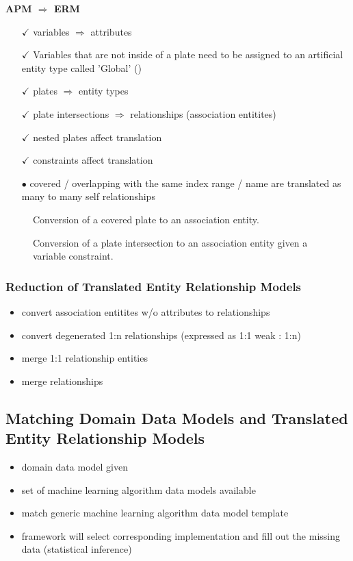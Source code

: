 \textbf{APM $\Rightarrow$ ERM}
\begin{enumerate}
\item[$\checkmark$] variables $\Rightarrow$ attributes 
\item[$\checkmark$] Variables that are not inside of a plate need to be assigned to an artificial entity type called 'Global' (\cite{heckerman2007probabilistic})
\item[$\checkmark$] plates $\Rightarrow$ entity types 
\item[$\checkmark$] plate intersections $\Rightarrow$ relationships (association entitites)
\item[$\checkmark$] nested plates affect translation
\item[$\checkmark$] constraints affect translation
\item[$\bullet$] covered / overlapping with the same index range / name are translated as many to many self relationships
\end{enumerate}

\begin{figure}
\centering
\scalebox{\tikzScale}{\adjustTikzSize }
\caption{Conversion of a covered plate to an association entity.}\label{fig:pm2erm_covered_1}
\end{figure}

\begin{figure}
\centering
\scalebox{\tikzScale}{\adjustTikzSize }
\caption{Conversion of a plate intersection to an association entity given a variable constraint.}\label{fig:pm2erm_bi_constraints}
\end{figure}

\subsubsection{Reduction of Translated Entity Relationship Models}
\label{sec:erm_reduction}

\begin{itemize}
\item convert association entitites w/o attributes to relationships
\item convert degenerated 1:n relationships (expressed as 1:1 weak : 1:n)
\item merge 1:1 relationship entities
\item merge relationships
\end{itemize}

\subsection{Matching Domain Data Models and Translated Entity Relationship Models}

\begin{itemize}
\item domain data model given
\item set of machine learning algorithm data models available
\item match generic machine learning algorithm data model template
\item framework will select corresponding implementation and fill out the missing data (statistical inference)
\end{itemize}
